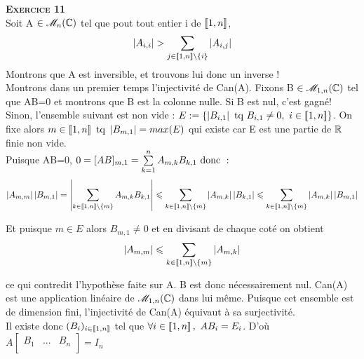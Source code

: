 \documentclass[a4paper, 10pt]{article}
\newcommand{\sumkn}{\bigsum_{k=1}^{n}}
\newcommand{\intentp}[3]{\intent{#1}{#2}\backslash\lbrace{#3}\rbrace}
\newcommand{\fai}[2]{\forall #1 \in #2,\ }
\begin{document}
\textsc{\bfseries\huge Exercice 11}\\

Soit A \(\in \mathscr{M}_{n}(\mathbb{C}) \) tel que pout tout entier i de \(\left[\!\left[1,n\right]\!\right]\),
\[ \card{A_{i,i}} > \bigsum_{j \in \intentp{1}{n}{i}} \card{A_{i,j}} \]
Montrons que A est inversible, et trouvons lui donc un inverse !\\ 

Montrons dans un premier temps l'injectivité de Can(A). Fixons B \( \in \mathscr{M}_{1,n}(\mathbb{C})\) tel que AB=0 et montrons que B est la colonne nulle. Si B est nul, c'est gagné! Sinon, l'ensemble suivant est non vide : \(E := \left\{\left|B_{i,1}\right| \text{ tq } B_{i,1}\neq0,\ i \in \left[\!\left[1,n\right]\!\right]\right\}\). On fixe alors \(m \in\left[\!\left[1,n\right]\!\right] \text{ tq } \left|B_{m,1}\right|=max(E)\) qui existe car E est une partie de \(\mathbb{R}\) finie non vide.\\

Puisque AB=0, \(0=[AB]_{m,1}=\sumkn A_{m,k}B_{k,1} \donc : \) \[  \card{A_{m,m}}\card{B_{m,1}} = \card{\bigsum_{k \in \intentp{1}{n}{m} }A_{m,k}B_{k,1}} \leq\bigsum_{k \in \intentp{1}{n}{m} }\card{A_{m,k}}\card{B_{k,1}} \leq \bigsum_{k \in \intentp{1}{n}{m} }\card{A_{m,k}}\card{B_{m,1}} \] 

Et puisque \(m \in E\) alors \(B_{m,1} \ne 0\) et en divisant de chaque coté on obtient  \[\card{A_{m,m}} \leq \bigsum_{k \in \intentp{1}{n}{m} }\card{A_{m,k}}  \]

ce qui contredit l'hypothèse faite sur A. B est donc nécessairement nul. Can(A) est une application linéaire de \(\mathscr{M}_{1,n}(\mathbb{C})\) dans lui même. Puisque cet ensemble est de dimension fini, l'injectivité de Can(A) équivaut à sa surjectivité.\\

Il existe donc \((B_{i})_{i\in\left[\!\left[1,n\right]\!\right]}\) tel que \(\fai{i}{\intent{1}{n}} AB_{i}=E_{i} \). D'où \(A\left[\begin{array}{c|c|c}
		B_{1} & ... & B_{n} \\
		\end{array}\right]=I_{n}\)
\end{document}
